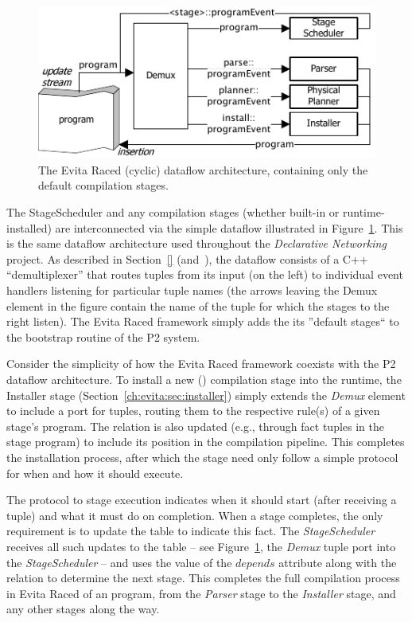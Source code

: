 \begin{figure}[htbp]
\begin{center}
\includegraphics[scale=1.5]{figures/DefaultCompiler}
\ssp
\caption{The Evita Raced (cyclic) dataflow architecture, containing only the default compilation stages.}
\label{ch:evita:fig:basecompiler}
\end{center}
\end{figure}

The StageScheduler and any compilation stages (whether built-in or
runtime-installed) are interconnected via the simple dataflow illustrated in
Figure~\ref{ch:evita:fig:basecompiler}.  This is the same dataflow architecture
used throughout the {\em Declarative Networking} project.  As described in
Section~\ref{} (and~\cite{p2:sosp}), the dataflow consists of a C++ ``demultiplexer''
that routes tuples from its input (on the left) to individual event handlers
listening for particular tuple names (the arrows leaving the Demux element in
the figure contain the name of the tuple for which the stages to the
right listen).  The Evita Raced framework simply adds the its ''default
stages`` to the bootstrap routine of the P2 system.

Consider the simplicity of how the Evita Raced framework coexists with the P2
dataflow architecture.  To install a new (\OVERLOG) compilation stage into the
runtime, the Installer stage (Section~\ref{ch:evita:sec:installer}) simply extends
the {\em Demux} element to include a port for 
tuples, routing them to the respective rule(s) of a given stage's \OVERLOG
program. The  relation is also updated (e.g., through fact tuples
in the \OVERLOG stage program) to include its position in the compilation pipeline.
This completes the installation process, after which the \OVERLOG stage need only 
follow a simple protocol for when and how it should execute. 

The protocol to stage execution indicates when it should start (after receiving
a  tuple) and what it must do on completion.  When a
stage completes, the only requirement is to update the  table to
indicate this fact.  The {\em StageScheduler} receives all such updates to the
 table -- see Figure~\ref{ch:evita:fig:basecompiler}, the {\em
Demux}  tuple port into the {\em StageScheduler} -- and uses the
value of the  $depends$ attribute along with the 
relation to determine the next stage.  This completes the full compilation
process in Evita Raced of an \OVERLOG program, from the {\em Parser} stage to the {\em
Installer} stage, and any other stages along the way.

